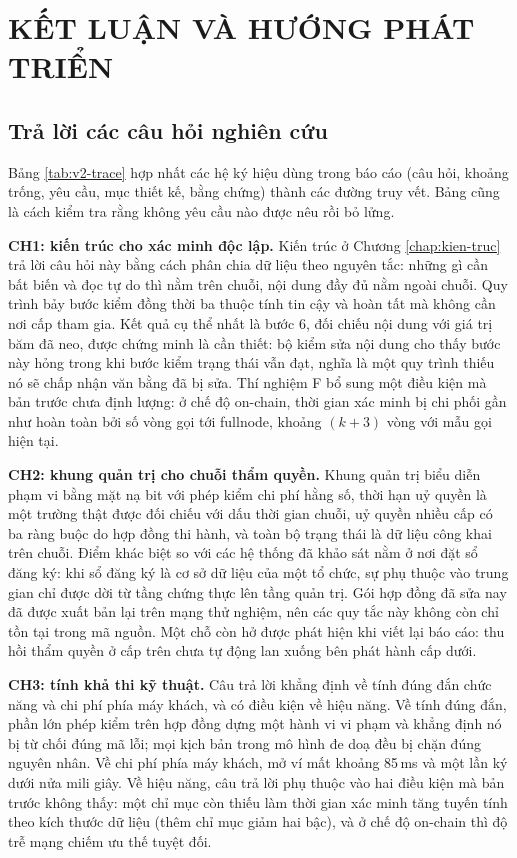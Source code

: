 \chapter{KẾT LUẬN VÀ HƯỚNG PHÁT TRIỂN}
\label{chap:ket-luan}

\section{Trả lời các câu hỏi nghiên cứu}
\label{sec:tra-loi}

Bảng \ref{tab:v2-trace} hợp nhất các hệ ký hiệu dùng trong báo cáo (câu hỏi, khoảng trống, yêu cầu, mục thiết kế, bằng chứng) thành các đường truy vết. Bảng cũng là cách kiểm tra rằng không yêu cầu nào được nêu rồi bỏ lửng.



\textbf{CH1: kiến trúc cho xác minh độc lập.} Kiến trúc ở Chương \ref{chap:kien-truc} trả lời câu hỏi này bằng cách phân chia dữ liệu theo nguyên tắc: những gì cần bất biến và đọc tự do thì nằm trên chuỗi, nội dung đầy đủ nằm ngoài chuỗi. Quy trình bảy bước kiểm đồng thời ba thuộc tính tin cậy và hoàn tất mà không cần nơi cấp tham gia. Kết quả cụ thể nhất là bước 6, đối chiếu nội dung với giá trị băm đã neo, được chứng minh là cần thiết: bộ kiểm sửa nội dung cho thấy bước này hỏng trong khi bước kiểm trạng thái vẫn đạt, nghĩa là một quy trình thiếu nó sẽ chấp nhận văn bằng đã bị sửa. Thí nghiệm F bổ sung một điều kiện mà bản trước chưa định lượng: ở chế độ on-chain, thời gian xác minh bị chi phối gần như hoàn toàn bởi số vòng gọi tới fullnode, khoảng $(k+3)$ vòng với mẫu gọi hiện tại.

\textbf{CH2: khung quản trị cho chuỗi thẩm quyền.} Khung quản trị biểu diễn phạm vi bằng mặt nạ bit với phép kiểm chi phí hằng số, thời hạn uỷ quyền là một trường thật được đối chiếu với dấu thời gian chuỗi, uỷ quyền nhiều cấp có ba ràng buộc do hợp đồng thi hành, và toàn bộ trạng thái là dữ liệu công khai trên chuỗi. Điểm khác biệt so với các hệ thống đã khảo sát nằm ở nơi đặt sổ đăng ký: khi sổ đăng ký là cơ sở dữ liệu của một tổ chức, sự phụ thuộc vào trung gian chỉ được dời từ tầng chứng thực lên tầng quản trị. Gói hợp đồng đã sửa nay đã được xuất bản lại trên mạng thử nghiệm, nên các quy tắc này không còn chỉ tồn tại trong mã nguồn. Một chỗ còn hở được phát hiện khi viết lại báo cáo: thu hồi thẩm quyền ở cấp trên chưa tự động lan xuống bên phát hành cấp dưới.

\textbf{CH3: tính khả thi kỹ thuật.} Câu trả lời khẳng định về tính đúng đắn chức năng và chi phí phía máy khách, và có điều kiện về hiệu năng. Về tính đúng đắn, phần lớn phép kiểm trên hợp đồng dựng một hành vi vi phạm và khẳng định nó bị từ chối đúng mã lỗi; mọi kịch bản trong mô hình đe doạ đều bị chặn đúng nguyên nhân. Về chi phí phía máy khách, mở ví mất khoảng 85\,ms và một lần ký dưới nửa mili giây. Về hiệu năng, câu trả lời phụ thuộc vào hai điều kiện mà bản trước không thấy: một chỉ mục còn thiếu làm thời gian xác minh tăng tuyến tính theo kích thước dữ liệu (thêm chỉ mục giảm hai bậc), và ở chế độ on-chain thì độ trễ mạng chiếm ưu thế tuyệt đối.

